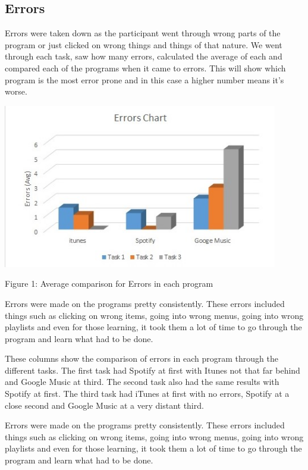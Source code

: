 \documentclass{article}
\begin{document}
\subsection{Errors}
Errors were taken down as the participant went through wrong parts of the program or just clicked on wrong things and things of that nature. We went through each task, saw how many errors, calculated the average of each and compared each of the programs when it came to errors. This will show which program is the most error prone and in this case a higher number means it's worse.

\begin{center}
\includegraphics[width=120mm]{Errors.jpg}
\end{center}
\begin{center}
Figure 1: Average comparison for Errors in each program
\end{center}

Errors were made on the programs pretty consistently. These errors included things such as clicking on wrong items, going into wrong menus, going into wrong playlists  and even for those learning, it took them a lot of time to go through the program and learn what had to be done.

These columns show the comparison of errors in each program through the different tasks. The first task had Spotify at first with Itunes not that far behind and Google Music at third. The second task also had the same results with Spotify at first. The third task had iTunes at first with no errors, Spotify at a close second and Google Music at a very distant third.

Errors were made on the programs pretty consistently. These errors included things such as clicking on wrong items, going into wrong menus, going into wrong playlists  and even for those learning, it took them a lot of time to go through the program and learn what had to be done.
\end{document}
